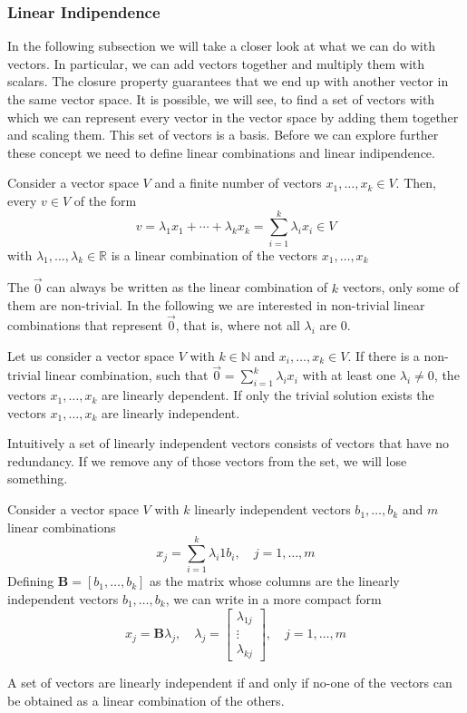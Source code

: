 \subsubsection{Linear Indipendence}
In the following subsection we will take a closer look at what we can do with vectors. In particular, we can add vectors together and multiply them with scalars. The closure property guarantees that we end up with another vector in the same vector space. It is possible, we will see, to find a set of vectors with which we can represent every vector in the vector space by adding them together and scaling them. This set of vectors is a basis. Before we can explore further these concept we need to define linear combinations and linear indipendence.

\begin{definition}
    Consider a vector space $V$ and a finite number of vectors $x_1,\ldots, x_k \in V$. Then, every $v \in V$ of the form
    \[
        v = \lambda_1x_1 + \cdots + \lambda_kx_k = \sum_{i=1}^{k}{\lambda_ix_i} \in V
    \] 
    with $\lambda_1,\ldots,\lambda_k \in \mathbb{R}$ is a linear combination of the vectors $x_1,\ldots, x_k$
\end{definition}
The $\vec{0}$ can always be written as the linear combination of $k$ vectors, only some of them are non-trivial. In the following we are interested in non-trivial linear combinations that represent $\vec{0}$, that is, where not all $\lambda_i$ are 0.
\begin{definition}
    Let us consider a vector space $V$ with $k \in \mathbb{N}$ and $x_i, \ldots, x_k \in V$. If there is a non-trivial linear combination, such that $\vec{0} = \sum_{i=1}^{k}{\lambda_ix_i}$ with at least one $\lambda_i \neq 0$, the vectors $x_1,\ldots, x_k$ are linearly dependent. If only the trivial solution exists the vectors $x_1, \ldots, x_k$ are linearly independent.
\end{definition}
Intuitively a set of linearly independent vectors consists of vectors that have no redundancy. If we remove any of those vectors from the set, we will lose something.
\begin{remark}
    Consider a vector space $V$ with $k$ linearly independent vectors $b_1,\ldots,b_k$ and $m$ linear combinations
    \[
        x_j = \sum_{i=1}^{k}{\lambda_i1b_i}, \quad j= 1,\ldots, m
    \]
    Defining $\mathbf{B} = [b_1,\ldots,b_k]$ as the matrix whose columns are the linearly independent vectors $b_1,\ldots,b_k$, we can write in a more compact form
    \[
        x_j = \mathbf{B}\lambda_j, \quad \lambda_j = \begin{bmatrix}
            \lambda_{1j}\\ \vdots \\ \lambda_{kj}
        \end{bmatrix}, \quad j = 1,\ldots, m
    \]
\end{remark}
A set of vectors are linearly independent if and only if no-one of the vectors can be obtained as a linear combination of the others.\\
